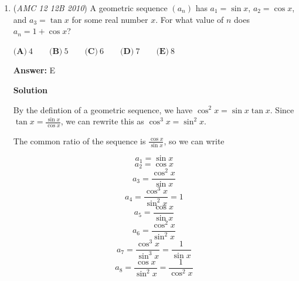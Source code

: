 \begin{enumerate}
 Now, we can finish the arithmetic progression:

 $5, 14, 23, 32$ - The Wildcats

 Thus our answer is $5+10+5+14=34$




\textbf{Solution 4 (solution 2 variant)}

Raiders: $a, am, am^2, am^3$ 

 Wildcats: $a, a + n, a + 2n, a + 3n,$ 

 where $a$ represents both teams' score in the first quarter. Let the Raiders finish with a score of $r$. We know $4a + 6n + 1 = a(1 + m + m^2 + m^3) = r.$ Since $r \le 100$, $1 + m + m^2 + m^3$ can either be $4, 15, 40,$ or $85$. Solve for $a$ in both equations in terms of $r$ and set them equal to each other:

 $\frac{r - (6n + 1)}{4} = \frac{r}{1 + m + m^2 + m^3}.$ We know $1 + m + m^2 + m^3$ can't be $4$ because then $n$ would be a fraction. So let's try $15$:

 $\frac{r - (6n + 1)}{4} = \frac{r}{15} \implies 11r = 90n + 15.$ We know $r$ has to be a multiple of 15 for $a$ to be an integer. After some guess and check with the first few multiples of 15, we find that if $r = 75, n = 9.$ Then $a = 5$. Since this whole case is based on $1 + m + m^2 + m^3 = 15, m = 2$. So our answer is $3a + am + n = \boxed{34}.$

 \textbf{ᴠɪᴅᴇᴏ ѕᴏʟᴜᴛɪᴏɴ ʙʏ ᴘɪ ᴀᴄᴀᴅᴇᴍʏ} 


	\item (\textit{AMC 12 12B 2010}) A geometric sequence $(a_n)$ has $a_1=\sin x$, $a_2=\cos x$, and $a_3= \tan x$ for some real number $x$. For what value of $n$ does $a_n=1+\cos x$?


 

$\textbf{(A)}\ 4 \qquad \textbf{(B)}\ 5 \qquad \textbf{(C)}\ 6 \qquad \textbf{(D)}\ 7 \qquad \textbf{(E)}\ 8$

 \textbf{Answer: }E



\textbf{Solution}

By the defintion of a geometric sequence, we have $\cos^2x=\sin x \tan x$. Since $\tan x=\frac{\sin x}{\cos x}$, we can rewrite this as $\cos^3x=\sin^2x$. 

 The common ratio of the sequence is $\frac{\cos x}{\sin x}$, so we can write

 
 \[a_1= \sin x\]
 \[a_2= \cos x\]
 \[a_3= \frac{\cos^2x}{\sin x}\]
 \[a_4=\frac{\cos^3x}{\sin^2x}=1\]
 \[a_5=\frac{\cos x}{\sin x}\]
 \[a_6=\frac{\cos^2x}{\sin^2x}\]
 \[a_7=\frac{\cos^3x}{\sin^3x}=\frac{1}{\sin x}\]
 \[a_8=\frac{\cos x}{\sin^2 x}=\frac{1}{\cos^2 x}\]


\end{enumerate}
